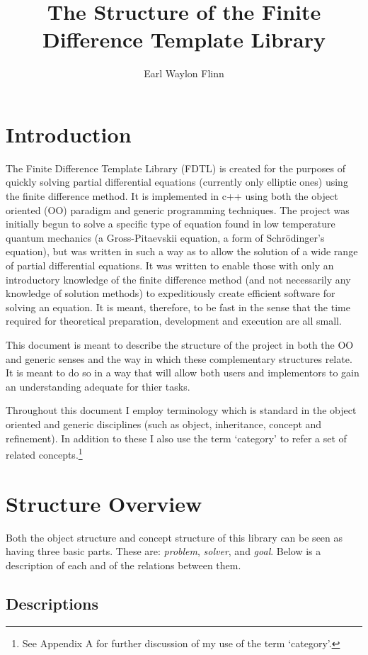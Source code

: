 \documentclass{article}
\title{The Structure of the Finite Difference Template Library}
\author{Earl Waylon Flinn}
\begin{document}
\maketitle
\section{Introduction}


The Finite Difference Template Library (FDTL) is created for the purposes of quickly solving
partial differential equations (currently
only elliptic ones) using the finite difference method. It is implemented in c++ using both the object
oriented (OO) paradigm and generic programming techniques. The project was initially begun to solve a specific
type of equation found in low temperature quantum mechanics (a Gross-Pitaevskii equation, a form of
Schr\"odinger's equation), but was written
in such a way as to allow the solution of a wide range of partial differential equations. It was written
to enable those with only an introductory knowledge of the finite difference method
(and not necessarily any knowledge of solution methods) to  expeditiously create efficient software
for solving an equation. It is meant, therefore, to be fast in the sense that the time required for
theoretical preparation, development and execution are all small.


This document is meant to describe the structure of the project in both the OO and generic senses and the
way in which these complementary structures relate. It is meant to do so in a way that will allow both users
and implementors to gain an understanding adequate for thier tasks.


Throughout this document I employ terminology which is standard in the object oriented and generic disciplines (such as object, inheritance,
concept and refinement). In addition to these I also use the term `category' to refer a set of related
concepts.\footnote{ See Appendix A for further discussion of my use of the term `category'.}

\section{Structure Overview}

Both the object structure and concept structure of this library can be seen as having
three basic parts. These are: \emph{problem},
\emph{solver}, and \emph{goal}. Below is a description of each and of the relations between them.

\subsection{Descriptions}
\end{document}
